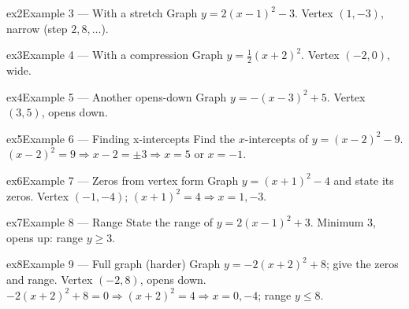 \documentclass[11pt]{article}
\begin{document}
\begin{example}{ex2}{Example 3 --- With a stretch}
Graph $y=2(x-1)^2-3$.
\soln Vertex $(1,-3)$, narrow (step $2,8,\dots$).
\end{example}

\begin{example}{ex3}{Example 4 --- With a compression}
Graph $y=\tfrac12(x+2)^2$.
\soln Vertex $(-2,0)$, wide.
\end{example}

\begin{example}{ex4}{Example 5 --- Another opens-down}
Graph $y=-(x-3)^2+5$.
\soln Vertex $(3,5)$, opens down.
\end{example}

\begin{example}{ex5}{Example 6 --- Finding x-intercepts}
Find the $x$-intercepts of $y=(x-2)^2-9$.
\soln $(x-2)^2=9\Rightarrow x-2=\pm3\Rightarrow x=5$ or $x=-1.$
\end{example}

\begin{example}{ex6}{Example 7 --- Zeros from vertex form}
Graph $y=(x+1)^2-4$ and state its zeros.
\soln Vertex $(-1,-4)$; $(x+1)^2=4\Rightarrow x=1,-3.$
\end{example}

\begin{example}{ex7}{Example 8 --- Range}
State the range of $y=2(x-1)^2+3$.
\soln Minimum $3$, opens up: range $y\ge3.$
\end{example}

\begin{example}{ex8}{Example 9 --- Full graph (harder)}
Graph $y=-2(x+2)^2+8$; give the zeros and range.
\soln Vertex $(-2,8)$, opens down. $-2(x+2)^2+8=0\Rightarrow (x+2)^2=4\Rightarrow x=0,-4$; range $y\le8.$
\end{example}
\end{document}
